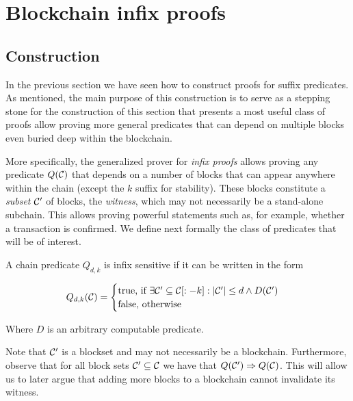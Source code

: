 \section{Blockchain infix proofs}
\label{sec:infix}

\subsection{Construction}

In the previous section we have seen how to construct proofs for suffix
predicates. As mentioned, the main purpose of this construction is to serve as a
stepping stone for the construction of this section that presents a most useful
class of proofs allow proving more general predicates that can depend on
multiple blocks even buried deep within the blockchain.

More specifically, the generalized prover for \emph{infix proofs} allows
proving any predicate $Q(\mathcal{C})$ that depends on a number of blocks that can
appear anywhere within the chain (except the $k$ suffix for stability). These
blocks constitute a \emph{subset} $\mathcal{C}'$ of blocks, the \emph{witness},
which may not necessarily be a stand-alone subchain. This allows proving
powerful statements such as, for example, whether a transaction is confirmed. We
define next formally the class of predicates that will be of interest.

\begin{definition}
\label{def:infix}
A chain predicate $Q_{d,k}$ is \textnormal{infix sensitive} if it can be
written in the form

$$
Q_{d,k}(\mathcal{C}) =
\begin{cases}
  \text{true, if }
    \exists \mathcal{C}' \subseteq \mathcal{C}[:-k]: |\mathcal{C}'| \leq d \land D(\mathcal{C}')\\
  \text{false, otherwise}
\end{cases}
$$

Where $D$ is an arbitrary computable predicate.
\end{definition}

Note that $\mathcal{C}'$ is a blockset and may not necessarily be a blockchain.
Furthermore, observe that for all block sets $\mathcal{C}' \subseteq \mathcal{C}$ we have
that $Q(\mathcal{C}') \Rightarrow Q(\mathcal{C})$. This will allow us to later argue that
adding more blocks to a blockchain cannot invalidate its witness.

